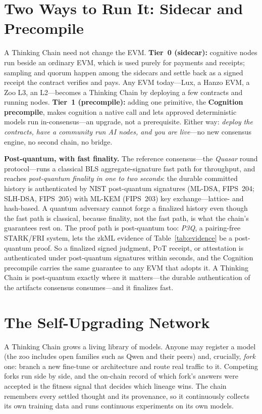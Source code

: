 \documentclass[11pt]{article}
\newcommand{\PoT}{\textsc{PoT}}
\begin{document}
\section{Two Ways to Run It: Sidecar and Precompile}
\label{sec:precompile}

A Thinking Chain need not change the EVM. \textbf{Tier~0 (sidecar):} cognitive nodes run beside an ordinary EVM, which is used purely for payments and receipts; sampling and quorum happen among the sidecars and settle back as a signed receipt the contract verifies and pays. Any EVM today---Lux, a Hanzo EVM, a Zoo L3, an L2---becomes a Thinking Chain by deploying a few contracts and running nodes. \textbf{Tier~1 (precompile):} adding one primitive, the \textbf{Cognition precompile}, makes cognition a native call and lets approved deterministic models run in-consensus---an upgrade, not a prerequisite. Either way: \emph{deploy the contracts, have a community run AI nodes, and you are live}---no new consensus engine, no second chain, no bridge.

\medskip\noindent\textbf{Post-quantum, with fast finality.} The reference consensus---the \emph{Quasar} round protocol---runs a classical BLS aggregate-signature fast path for throughput, and reaches \emph{post-quantum finality in one to two seconds}: the durable committed history is authenticated by NIST post-quantum signatures (ML-DSA, FIPS~204; SLH-DSA, FIPS~205) with ML-KEM (FIPS~203) key exchange---lattice- and hash-based. A quantum adversary cannot forge a finalized history even though the fast path is classical, because finality, not the fast path, is what the chain's guarantees rest on. The proof path is post-quantum too: \emph{P3Q}, a pairing-free STARK/FRI system, lets the zkML evidence of Table~\ref{tab:evidence} be a post-quantum proof. So a finalized signed judgment, \PoT{} receipt, or attestation is authenticated under post-quantum signatures within seconds, and the Cognition precompile carries the same guarantee to any EVM that adopts it. A Thinking Chain is post-quantum exactly where it matters---the durable authentication of the artifacts consensus consumes---and it finalizes fast.

\section{The Self-Upgrading Network}

A Thinking Chain grows a living library of models. Anyone may register a model (the zoo includes open families such as Qwen and their peers) and, crucially, \emph{fork} one: branch a new fine-tune or architecture and route real traffic to it. Competing forks run side by side, and the on-chain record of which fork's answers were accepted is the fitness signal that decides which lineage wins. The chain remembers every settled thought and its provenance, so it continuously collects its own training data and runs continuous experiments on its own models.
\end{document}
